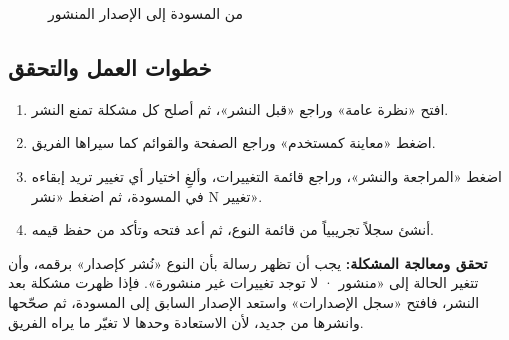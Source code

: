 \begin{figure}[H]
\centering
{}
\rclegend
\caption{من المسودة إلى الإصدار المنشور}
\label{fig:builder-publish-flow}
\end{figure}

\subsection{خطوات العمل والتحقق}
\begin{enumerate}
\item افتح «نظرة عامة» وراجع «قبل النشر»، ثم أصلح كل مشكلة تمنع النشر.
\item اضغط «معاينة كمستخدم» وراجع الصفحة والقوائم كما سيراها الفريق.
\item اضغط «المراجعة والنشر»، وراجع قائمة التغييرات، وألغِ اختيار أي تغيير تريد إبقاءه في المسودة، ثم اضغط «نشر N تغيير».
\item أنشئ سجلاً تجريبياً من قائمة النوع، ثم أعد فتحه وتأكد من حفظ قيمه.
\end{enumerate}

\textbf{تحقق ومعالجة المشكلة:} يجب أن تظهر رسالة بأن النوع «نُشر كإصدار» برقمه، وأن تتغير الحالة إلى «منشور · لا توجد تغييرات غير منشورة». فإذا ظهرت مشكلة بعد النشر، فافتح «سجل الإصدارات» واستعد الإصدار السابق إلى المسودة، ثم صحّحها وانشرها من جديد، لأن الاستعادة وحدها لا تغيّر ما يراه الفريق.
